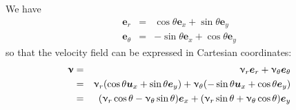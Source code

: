 We have 
\begin{eqnarray}
{\bm e}_r      &=& \cos\theta {\bm e}_x + \sin\theta {\bm e}_y \\
{\bm e}_\theta &=& -\sin\theta {\bm e}_x + \cos\theta {\bm e}_y
\end{eqnarray}
so that the velocity field can be expressed in Cartesian coordinates:
\begin{eqnarray}
{\bm \upnu} 
&=& \upnu_r {\bm e}_r + \upnu_\theta {\bm e}_\theta \nonumber\\
&=& \upnu_r ( \cos\theta {\bm u}_x + \sin\theta {\bm e}_y) + \upnu_\theta (-\sin\theta {\bm u}_x + \cos\theta {\bm e}_y) \nonumber\\
&=& ( \upnu_r \cos\theta - \upnu_\theta \sin\theta  ) {\bm e}_x + ( \upnu_r \sin\theta + \upnu_\theta\cos\theta  ) {\bm e}_y
\end{eqnarray}








